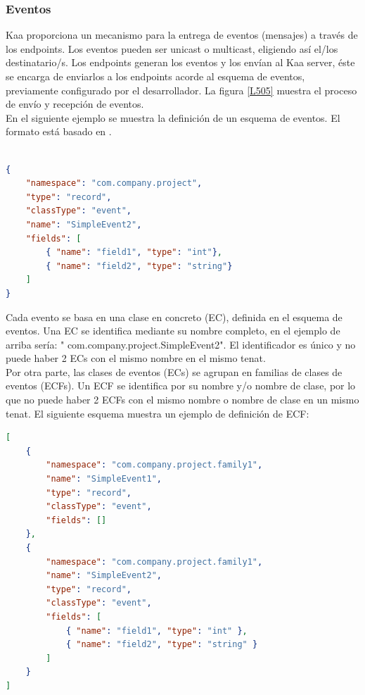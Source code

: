 \documentclass[12pt, twoside]{book}
\newcommand{\MYhref}[3][blue]{\href{#2}{\color{#1}{#3}}}
\begin{document}
\subsubsection*{Eventos}
Kaa proporciona un mecanismo para la entrega de eventos (mensajes) a través de los endpoints. Los eventos pueden ser unicast o multicast, eligiendo así el/los destinatario/s. Los endpoints generan los eventos y los envían al Kaa server, éste se encarga de enviarlos a los endpoints acorde al esquema de eventos, previamente configurado por el desarrollador. La figura \ref{L505} muestra el proceso de envío y recepción de eventos.\\
En el siguiente ejemplo se muestra la definición de un esquema de eventos. El formato está basado en \MYhref{http://avro.apache.org/docs/current/spec.html}{Avro Schema}.
\begin{lstlisting}[language=json]

{
    "namespace": "com.company.project",
    "type": "record",
    "classType": "event",
    "name": "SimpleEvent2",
    "fields": [
        { "name": "field1", "type": "int"},
        { "name": "field2", "type": "string"}
    ]
}

\end{lstlisting}
Cada evento se basa en una clase en concreto (EC), definida en el esquema de eventos. Una EC se identifica mediante su nombre completo, en el ejemplo de arriba sería: " com.company.project.SimpleEvent2". El identificador es único y no puede haber 2 ECs con el mismo nombre en el mismo tenat.\\

Por otra parte, las clases de eventos (ECs) se agrupan en familias de clases de eventos (ECFs). Un ECF se identifica por su nombre y/o nombre de clase, por lo que no puede haber 2 ECFs con el mismo nombre o nombre de clase en un mismo tenat. El siguiente esquema muestra un ejemplo de definición de ECF:
\begin{lstlisting}[language=json]
[
    {
        "namespace": "com.company.project.family1",
        "name": "SimpleEvent1",
        "type": "record",
        "classType": "event",
        "fields": []
    },
    {
        "namespace": "com.company.project.family1",
        "name": "SimpleEvent2",
        "type": "record",
        "classType": "event",
        "fields": [
            { "name": "field1", "type": "int" },
            { "name": "field2", "type": "string" }
        ]
    }
]
\end{lstlisting}
\end{document}
